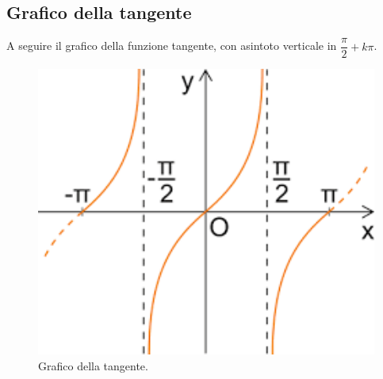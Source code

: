 \documentclass[12pt]{article}
\begin{document}
\subsection{Grafico della tangente}
A seguire il grafico della funzione tangente, con asintoto verticale in $\dfrac{\pi}{2} + k\pi$.
\begin{figure}[!htb]
    \centering
    \includegraphics[width=1\textwidth, height=.7\textheight,keepaspectratio]{lezione_6/grafico_tangente.png}
    \begin{center}
        \caption{\label{fig:grafico_tangente}Grafico della tangente.}
    \end{center}
\end{figure}\\
\end{document}
